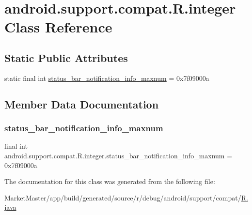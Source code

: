\hypertarget{classandroid_1_1support_1_1compat_1_1R_1_1integer}{}\section{android.\+support.\+compat.\+R.\+integer Class Reference}
\label{classandroid_1_1support_1_1compat_1_1R_1_1integer}
\subsection*{Static Public Attributes}
\begin{DoxyCompactItemize}
\item 
static final int \mbox{\hyperlink{classandroid_1_1support_1_1compat_1_1R_1_1integer_a5d0dcdb625a5957f6a037d53cde095c6}{status\+\_\+bar\+\_\+notification\+\_\+info\+\_\+maxnum}} = 0x7f09000a
\end{DoxyCompactItemize}


\subsection{Member Data Documentation}
\mbox{\label{classandroid_1_1support_1_1compat_1_1R_1_1integer_a5d0dcdb625a5957f6a037d53cde095c6}} 
\subsubsection{\texorpdfstring{status\+\_\+bar\+\_\+notification\+\_\+info\+\_\+maxnum}{status\_bar\_notification\_info\_maxnum}}
{\footnotesize\ttfamily final int android.\+support.\+compat.\+R.\+integer.\+status\+\_\+bar\+\_\+notification\+\_\+info\+\_\+maxnum = 0x7f09000a\hspace{0.3cm}{\ttfamily [static]}}



The documentation for this class was generated from the following file\+:\begin{DoxyCompactItemize}
\item 
Market\+Master/app/build/generated/source/r/debug/android/support/compat/\mbox{\hyperlink{debug_2android_2support_2compat_2R_8java}{R.\+java}}\end{DoxyCompactItemize}

